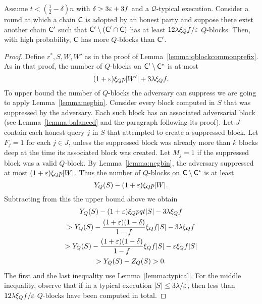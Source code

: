 \begin{lemma}\label{lemma:qblockcommonprefix12}
	Assume $t<(\frac12-\delta)n$ with $\delta>3\varepsilon+3f$ and a $\mathcal{Q}$-typical
	execution.
	Consider a round at which a chain $\mathsf{C}$ is adopted by an honest party and
	suppose there exist another chain $\mathsf{C}'$ such that
	$\mathsf{C}'\setminus(\mathsf{C}'\cap\mathsf{C})$ has at least $12\lambda\xi_Qf/\varepsilon$ $Q$-blocks.
	Then, with high probability, $\mathsf{C}$ has more $Q$-blocks than $\mathsf{C}'$.
\end{lemma}
\begin{proof}
	Define $r^*,S,W,W'$ as in the proof of
	Lemma~\ref{lemma:qblockcommonprefix}. As in that proof,
	the number of $Q$-blocks on $\mathsf{C}'\setminus\mathsf{C}^*$ is
	at most
	\[
		(1+\varepsilon)\xi_Qp|W'|+3\lambda\xi_Qf
	.\]
	To upper bound the number of $Q$-blocks the adversary can suppress we
	are going to apply Lemma~\ref{lemma:negbin}.
	Consider every block computed in $S$ that was suppressed by the
	adversary. Each such block has an associated adversarial block (see
	Lemma~\ref{lemma:balanced} and the paragraph following its proof).
	Let $J$ contain each honest query $j$ in $S$ that attempted to create
	a suppressed block.
	Let $F_j=1$ for each $j\in J$, unless the suppressed block was already
	more than $k$ blocks deep at the time its associated block was
	created.
	Let $M_j=1$ if the suppressed block was a valid $Q$-block.
	By Lemma~\ref{lemma:negbin}, the adversary suppressed at most
	$(1+\varepsilon)\xi_Qp|W|$. Thus
	the number of $Q$-blocks on $\mathsf{C}\setminus\mathsf{C}^*$ is at least
	\[
		Y_Q(S)-(1+\varepsilon)\xi_Qp|W|
	.\]
	Subtracting from this the upper bound above we obtain
	\begin{multline*}
		Y_Q(S)-(1+\varepsilon)\xi_Qpqt|S|-3\lambda\xi_Qf\\
		>Y_Q(S)-\frac{(1+\varepsilon)(1-\delta)}{1-f}\xi_Qf|S|-3\lambda\xi_Qf\\
		>Y_Q(S)-\frac{(1+\varepsilon)(1-\delta)}{1-f}\xi_Qf|S|-\varepsilon\xi_Qf|S|\\
		>Y_Q(S)-Z_Q(S)>0
	.\end{multline*}
	The first and the last inequality use Lemma~\ref{lemma:typical}. For
	the middle inequality, observe that if in a typical execution
	$|S|\le3\lambda/\varepsilon$, then less than $12\lambda\xi_Qf/\varepsilon$ $Q$-blocks
	have been computed in total.
\end{proof}
